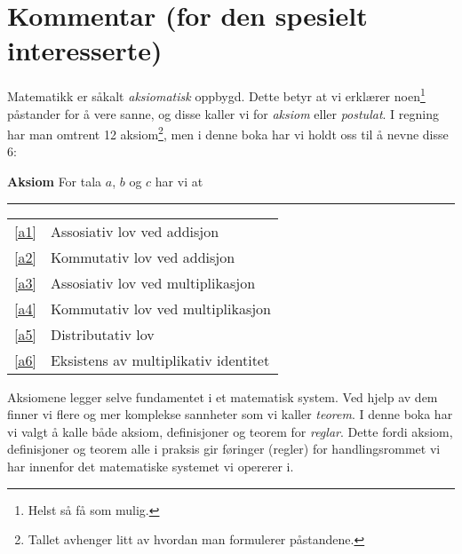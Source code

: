 



	
\section*{Kommentar (for den spesielt interesserte) \label{Kommentar1}}
Matematikk er såkalt \textit{aksiomatisk} oppbygd. Dette betyr at vi erklærer noen\footnote{Helst så få som mulig.} påstander for å vere sanne, og disse kaller vi for \textit{aksiom} eller \textit{postulat}. I regning har man omtrent 12 aksiom\footnote{Tallet avhenger litt av hvordan man formulerer påstandene.}, men i denne boka har vi holdt oss til å nevne disse 6:
\regv 

\begin{tcolorbox}[boxrule=0.3 mm,arc=0mm,colback=blue!5] {\large \textbf{Aksiom} \vspace{5 pt}}\newline
For tala $ a $, $ b $ og $ c $ har vi at
\rule{1\linewidth}{0.75bp}
\begin{center}
	\begin{tabular}{rl}
		\eqref{a1} &Assosiativ lov ved addisjon\\
		\eqref{a2} & Kommutativ lov ved addisjon \\	
		\eqref{a3} & Assosiativ lov ved multiplikasjon \\
		\eqref{a4} & Kommutativ lov ved multiplikasjon \\		
		\eqref{a5} & Distributativ lov\\	
		\eqref{a6} & Eksistens av multiplikativ identitet
	\end{tabular}
\end{center}
\end{tcolorbox}
\vsk
Aksiomene legger selve fundamentet i et matematisk system. Ved hjelp av dem finner vi flere og mer komplekse sannheter som vi kaller \textit{teorem}. I denne boka har vi valgt å kalle både aksiom, definisjoner og teorem for \textsl{reglar}. Dette fordi aksiom, definisjoner og teorem alle i praksis gir føringer (regler) for handlingsrommet vi har innenfor det matematiske systemet vi opererer i.\vsk
